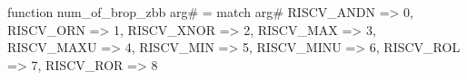 function num_of_brop_zbb arg# = match arg# {
  RISCV_ANDN => 0,
  RISCV_ORN => 1,
  RISCV_XNOR => 2,
  RISCV_MAX => 3,
  RISCV_MAXU => 4,
  RISCV_MIN => 5,
  RISCV_MINU => 6,
  RISCV_ROL => 7,
  RISCV_ROR => 8
}
